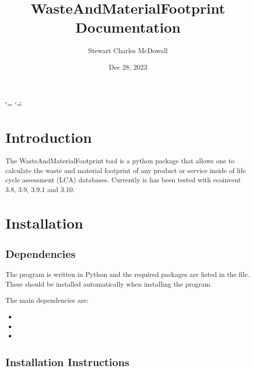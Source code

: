 \documentclass[letterpaper,10pt,english]{sphinxmanual}
\title{WasteAndMaterialFootprint Documentation}
\date{Dec 28, 2023}
\author{Stewart Charles McDowall}
\begin{document}
\ifdefined\shorthandoff
  \ifnum\catcode`\=\string=\active\shorthandoff{=}\fi
  \ifnum\catcode`\"=\active{}\fi
\fi

\pagestyle{empty}
\sphinxmaketitle
\pagestyle{plain}
\sphinxtableofcontents
\pagestyle{normal}
\label{\detokenize{index::doc}}


\sphinxstepscope


\chapter{Introduction}
\label{\detokenize{intro:introduction}}\label{\detokenize{intro::doc}}
\sphinxAtStartPar
The WasteAndMaterialFootprint tool is a python package that allows one to calculate the waste and material footprint of any product or service inside of life cycle assessment (LCA) databases. Currently is has been tested with ecoinvent 3.8, 3.9, 3.9.1 and 3.10.

\sphinxstepscope


\chapter{Installation}
\label{\detokenize{installation:installation}}\label{\detokenize{installation::doc}}

\section{Dependencies}
\label{\detokenize{installation:dependencies}}
\sphinxAtStartPar
The program is written in Python and the required packages are listed in the  file. These should be installed automatically when installing the program.

\sphinxAtStartPar
The main dependencies are:
\begin{itemize}
\item {} 
\sphinxAtStartPar
{}

\item {} 
\sphinxAtStartPar
{}

\item {} 
\sphinxAtStartPar
{}

\end{itemize}


\section{Installation Instructions}
\label{\detokenize{installation:installation-instructions}}
\sphinxAtStartPar
{}
\end{document}

